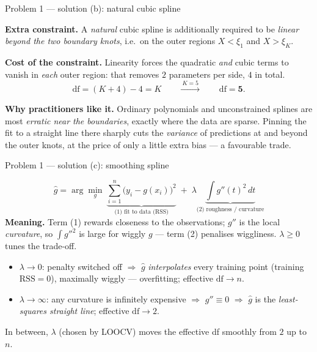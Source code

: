 \documentclass[aspectratio=169,11pt]{beamer}
\begin{document}
\begin{frame}{Problem 1 --- solution (b): natural cubic spline}
  \begin{solutionbox}
    \textbf{Extra constraint.} A \emph{natural} cubic spline is additionally required to be
    \emph{linear beyond the two boundary knots}, i.e.\ on the outer regions $X<\xi_1$ and $X>\xi_K$.
    \medskip

    \textbf{Cost of the constraint.} Linearity forces the quadratic \emph{and} cubic terms to vanish
    in \emph{each} outer region: that removes $2$ parameters per side, $4$ in total.
    \[
      \mathrm{df}=(K+4)-4=\boxed{K}
      \qquad\xrightarrow{\ K=5\ }\qquad \mathrm{df}=\mathbf{5}.
    \]

    \textbf{Why practitioners like it.} Ordinary polynomials and unconstrained splines are most
    \emph{erratic near the boundaries}, exactly where the data are sparse. Pinning the fit to a
    straight line there sharply cuts the \emph{variance} of predictions at and beyond the outer
    knots, at the price of only a little extra bias --- a favourable trade.
  \end{solutionbox}
\end{frame}

\begin{frame}{Problem 1 --- solution (c): smoothing spline}
  \begin{solutionbox}
    \[
      \hat g=\arg\min_{g}\ \underbrace{\sum_{i=1}^n\bigl(y_i-g(x_i)\bigr)^2}_{\text{(1) fit to data (RSS)}}
      \;+\;\lambda\underbrace{\int g''(t)^2\,dt}_{\text{(2) roughness / curvature}}
    \]
    \textbf{Meaning.} Term (1) rewards closeness to the observations; $g''$ is the local
    \emph{curvature}, so $\int g''^2$ is large for wiggly $g$ --- term (2) penalises wiggliness.
    $\lambda\ge 0$ tunes the trade-off.
    \begin{itemize}
      \item $\lambda\to 0$: penalty switched off $\Rightarrow$ $\hat g$ \emph{interpolates} every
        training point (training $\mathrm{RSS}=0$), maximally wiggly --- overfitting; effective
        $\mathrm{df}\to n$.
      \item $\lambda\to\infty$: any curvature is infinitely expensive $\Rightarrow$ $g''\equiv 0$
        $\Rightarrow$ $\hat g$ is the \emph{least-squares straight line}; effective $\mathrm{df}\to 2$.
    \end{itemize}
    In between, $\lambda$ (chosen by LOOCV) moves the effective df smoothly from $2$ up to $n$.
  \end{solutionbox}
\end{frame}
\end{document}
